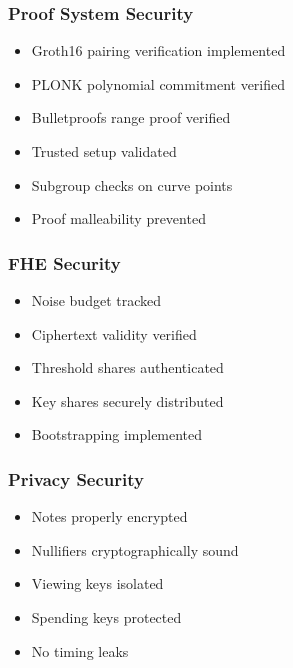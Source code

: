 \documentclass[
]{article}
\providecommand{\tightlist}{%
  \setlength{\itemsep}{0pt}\setlength{\parskip}{0pt}}
\begin{document}
\subsubsection{Proof System Security}\label{proof-system-security}

\begin{itemize}
\tightlist
\item[$\square$]
  Groth16 pairing verification implemented
\item[$\square$]
  PLONK polynomial commitment verified
\item[$\square$]
  Bulletproofs range proof verified
\item[$\square$]
  Trusted setup validated
\item[$\square$]
  Subgroup checks on curve points
\item[$\square$]
  Proof malleability prevented
\end{itemize}

\subsubsection{FHE Security}\label{fhe-security}

\begin{itemize}
\tightlist
\item[$\square$]
  Noise budget tracked
\item[$\square$]
  Ciphertext validity verified
\item[$\square$]
  Threshold shares authenticated
\item[$\square$]
  Key shares securely distributed
\item[$\square$]
  Bootstrapping implemented
\end{itemize}

\subsubsection{Privacy Security}\label{privacy-security}

\begin{itemize}
\tightlist
\item[$\square$]
  Notes properly encrypted
\item[$\square$]
  Nullifiers cryptographically sound
\item[$\square$]
  Viewing keys isolated
\item[$\square$]
  Spending keys protected
\item[$\square$]
  No timing leaks
\end{itemize}
\end{document}
